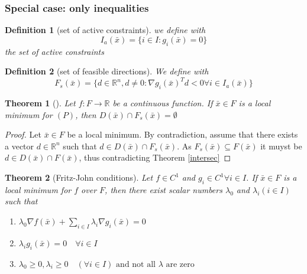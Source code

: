 \documentclass{book}
\newcommand{\R}{\mathbb{R}}
\theoremstyle{theoremv2}
\newtheorem{theorem}{Theorem}[chapter]
\theoremstyle{defv2}
\newtheorem{definition}{Definition}[chapter]
\theoremstyle{remark}
\theoremstyle{remark}
\begin{document}
\subsubsection{Special case: only inequalities}
\begin{definition}[set of active constraints]
    we define with 
    \[
        I_a (\bar{x}) = \{ i\in I:g_i(\bar{x})=0 \}
    \]
    the set of active constraints
\end{definition}
\begin{definition}[set of feasible directions]
    We define with 
    \[
        F_s(\bar{x})=\{ d\in\R^n, d\neq0 :\nabla g_i(\bar{x})^Td <0 \forall i \in I_a(\bar{x}) \}
    \]
\end{definition}
\begin{theorem}[]
    \label{theo6}
    Let $f:F\to\R$ be a continuous function. If $\bar{x}\in F$ is a local minimum for $(P)$, then $D(\bar{x})\cap F_s(\bar{x})=\emptyset$
\end{theorem}
\begin{proof}
    Let $\bar{x}\in F$ be a local minimum. By contradiction, assume that there exists a vector $d\in\R^n$ such that $d\in D(\bar{x})\cap F_s(\bar{x})$. As $F_s(\bar{x})\subseteq F(\bar{x})$ it muyst be $d\in D(\bar{x})\cap F(\bar{x})$, thus contradicting Theorem \ref{intersec}
\end{proof}
\begin{theorem}[Fritz-John conditions]
    \label{FJ}
    Let $f\in C^1$ and $g_i\in C^1 \forall i\in I$. If $\bar{x}\in F$ is a local minimum for $f$ over $F$, then there exist scalar numbers $\lambda_0$ and $\lambda_i(i\in I)$ such that 
    \begin{enumerate}
        \item $\lambda_0\nabla f(\bar{x}) + \sum_{i\in I} \lambda_i \nabla g_i(\bar{x})=0$
        \item $\lambda_i g_i(\bar{x})=0 \quad \forall i\in I$
        \item $\lambda_0\geq 0, \lambda_i \geq 0 \quad (\forall i \in I) \text{ and not all } \lambda \text{ are zero}$
    \end{enumerate}
\end{theorem}
\end{document}
